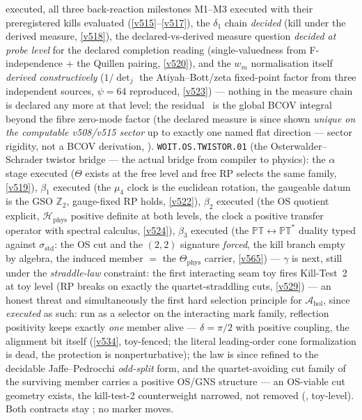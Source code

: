 \documentclass[11pt,a4paper]{article}
\newcommand{\Z}{\mathbb Z}
\begin{document}
\begin{keybox}
executed, all three back-reaction milestones M1--M3 executed with their preregistered kills
evaluated (\vref{v515}--\vref{v517}), the $\delta_1$ chain \emph{decided} (kill under the
derived measure, \vref{v518}), the declared-vs-derived measure question \emph{decided at probe
level} for the declared completion reading (single-valuedness from F-independence $+$ the
Quillen pairing, \vref{v520}), and the $w_m$ normalisation itself \emph{derived constructively}
($1/\det_j$ the Atiyah--Bott/zeta fixed-point factor from three independent sources, $\psi=64$
reproduced, \vref{v523}) --- nothing in the measure chain is declared any more at that level;
the residual \mO\ is the global BCOV integral beyond the fibre zero-mode factor (the declared
measure is since shown \emph{unique on the computable v508/v515 sector} up to exactly one
named flat direction --- sector rigidity, not a BCOV derivation,
).
\texttt{WOIT.OS.TWISTOR.01} (the Osterwalder--Schrader twistor bridge --- the actual bridge
from compiler to physics): the $\alpha$ stage executed ($\Theta$ exists at the free level and
free RP selects the same family, \vref{v519}), $\beta_1$ executed (the $\mu_4$ clock is the
euclidean rotation, the gaugeable datum is the GSO $\Z_2$, gauge-fixed RP holds, \vref{v522}),
$\beta_2$ executed (the OS quotient explicit, $\mathcal H_{\mathrm{phys}}$ positive definite at
both levels, the clock a positive transfer operator with spectral calculus, \vref{v524}),
$\beta_3$ executed (the $\mathbb{PT}\leftrightarrow\mathbb{PT}^*$ duality typed against
$\sigma_{\mathrm{std}}$: the OS cut and the $(2,2)$ signature \emph{forced}, the kill branch
empty by algebra, the induced member $=$ the $\Theta_{\mathrm{phys}}$ carrier, \vref{v565}) ---
$\gamma$ is next, still under the \emph{straddle-law} constraint: the first interacting seam toy
fires Kill-Test~2 at toy level (RP breaks on exactly the quartet-straddling cuts,
\vref{v529}) --- an honest threat and simultaneously the first hard selection principle for
$\mathcal A_{\mathrm{hol}}$, since \emph{executed} as such: run as a selector on the interacting
mark family, reflection positivity keeps exactly \emph{one} member alive --- $\delta=\pi/2$ with
positive coupling, the alignment bit itself (\vref{v534}, toy-fenced; the literal leading-order
cone formalization is dead, the protection is nonperturbative); the law is since refined to the
decidable Jaffe--Pedrocchi \emph{odd-split} form, and the quartet-avoiding cut family of the
surviving member carries a positive OS/GNS structure --- an OS-viable cut geometry exists, the
kill-test-2 counterweight narrowed, not removed
(, toy-level). Both contracts stay \mO; no
marker moves.
\end{keybox}
\end{document}
